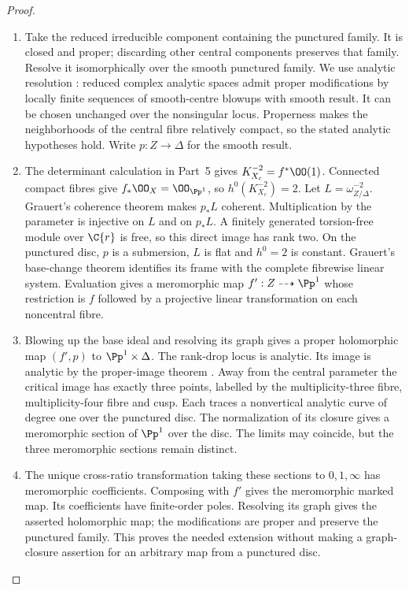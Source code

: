 \begin{proof}
\begin{enumerate}[label=\arabic*.,leftmargin=*]
\item Take the reduced irreducible component containing the punctured family. It is closed and proper; discarding other central components preserves that family. Resolve it isomorphically over the smooth punctured family. We use analytic resolution \cite[Theorem 1.6 and the following analytic-neighborhood paragraph, preprint p.~5]{BM97}: reduced complex analytic spaces admit proper modifications by locally finite sequences of smooth-centre blowups with smooth result. It can be chosen unchanged over the nonsingular locus. Properness makes the neighborhoods of the central fibre relatively compact, so the stated analytic hypotheses hold. Write $p:Z\to\Delta$ for the smooth result.

\item The determinant calculation in Part~5 gives $K_{X_c}^{-2}=f^*\OO(1)$. Connected compact fibres give $f_*\OO_X=\OO_{\Pp^1}$, so $h^0(K_{X_c}^{-2})=2$. Let $L=\omega_{Z/\Delta}^{-2}$. Grauert's coherence theorem \cite[Hauptsatz I]{Grauert60} makes $p_*L$ coherent. Multiplication by the parameter is injective on $L$ and on $p_*L$. A finitely generated torsion-free module over $\C\{r\}$ is free, so this direct image has rank two. On the punctured disc, $p$ is a submersion, $L$ is flat and $h^0=2$ is constant. Grauert's base-change theorem \cite[\S7, Satz 5]{Grauert60} identifies its frame with the complete fibrewise linear system. Evaluation gives a meromorphic map $f':Z\dashrightarrow\Pp^1$ whose restriction is $f$ followed by a projective linear transformation on each noncentral fibre.

\item Blowing up the base ideal and resolving its graph gives a proper holomorphic map $(f',p)$ to $\Pp^1\times\Delta$. The rank-drop locus is analytic. Its image is analytic by the proper-image theorem \cite[\S7, Satz 1]{Grauert60}. Away from the central parameter the critical image has exactly three points, labelled by the multiplicity-three fibre, multiplicity-four fibre and cusp. Each traces a nonvertical analytic curve of degree one over the punctured disc. The normalization of its closure gives a meromorphic section of $\Pp^1$ over the disc. The limits may coincide, but the three meromorphic sections remain distinct.

\item The unique cross-ratio transformation taking these sections to $0,1,\infty$ has meromorphic coefficients. Composing with $f'$ gives the meromorphic marked map. Its coefficients have finite-order poles. Resolving its graph gives the asserted holomorphic map; the modifications are proper and preserve the punctured family. This proves the needed extension without making a graph-closure assertion for an arbitrary map from a punctured disc.
\end{enumerate}
\end{proof}

